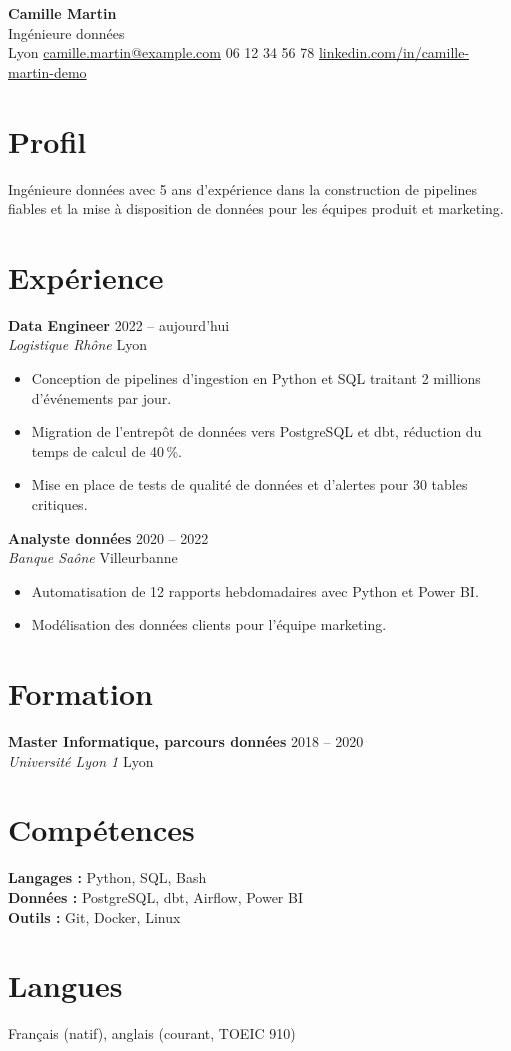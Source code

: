 \documentclass[10pt,a4paper]{article}
\newcommand{\entry}[4]{\textbf{#1} \hfill #2\\ \textit{#3} \hfill #4\\[-2pt]}
\begin{document}
\begin{center}
  {\Huge\bfseries Camille Martin}\\[4pt]
  {\large Ingénieure données}\\[4pt]
  Lyon \textbullet{} \href{mailto:camille.martin@example.com}{camille.martin@example.com} \textbullet{} 06 12 34 56 78 \textbullet{} \href{https://www.linkedin.com/in/camille-martin-demo}{linkedin.com/in/camille-martin-demo}
\end{center}

\section{Profil}
Ingénieure données avec 5 ans d'expérience dans la construction de pipelines fiables et la mise à disposition de données pour les équipes produit et marketing.

\section{Expérience}
\entry{Data Engineer}{2022 -- aujourd'hui}{Logistique Rhône}{Lyon}
\begin{itemize}
  \item Conception de pipelines d'ingestion en Python et SQL traitant 2 millions d'événements par jour.
  \item Migration de l'entrepôt de données vers PostgreSQL et dbt, réduction du temps de calcul de 40\,\%.
  \item Mise en place de tests de qualité de données et d'alertes pour 30 tables critiques.
\end{itemize}

\entry{Analyste données}{2020 -- 2022}{Banque Saône}{Villeurbanne}
\begin{itemize}
  \item Automatisation de 12 rapports hebdomadaires avec Python et Power BI.
  \item Modélisation des données clients pour l'équipe marketing.
\end{itemize}

\section{Formation}
\entry{Master Informatique, parcours données}{2018 -- 2020}{Université Lyon 1}{Lyon}

\section{Compétences}
\textbf{Langages :} Python, SQL, Bash\\
\textbf{Données :} PostgreSQL, dbt, Airflow, Power BI\\
\textbf{Outils :} Git, Docker, Linux

\section{Langues}
Français (natif), anglais (courant, TOEIC 910)
\end{document}
